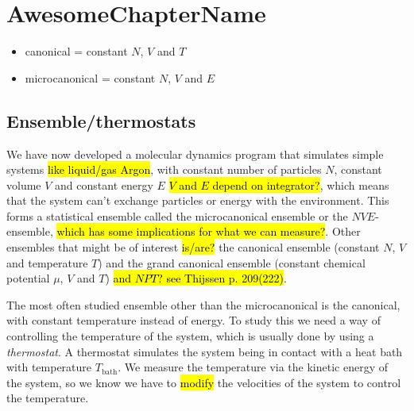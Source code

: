 \chapter{AwesomeChapterName}

\begin{itemize}
    \item canonical = constant $N$, $V$ and $T$
    \item microcanonical = constant $N$, $V$ and $E$
\end{itemize}


\section{Ensemble/thermostats}
We have now developed a molecular dynamics program that simulates simple systems \hl{like liquid/gas Argon}, with constant number of particles $N$, constant volume $V$ and constant energy $E$ \hl{$V$ and $E$ depend on integrator?}, which means that the system can't exchange particles or energy with the environment. This forms a statistical ensemble called the microcanonical ensemble or the $NVE$-ensemble, \hl{which has some implications for what we can measure?}. Other ensembles that might be of interest \hl{is/are?} the canonical ensemble (constant $N$, $V$ and temperature $T$) and the grand canonical ensemble (constant chemical potential $\mu$, $V$ and $T$) \hl{and $NPT$? see Thijssen p. 209(222)}.


The most often studied ensemble other than the microcanonical is the canonical, with constant temperature instead of energy. To study this we need a way of controlling the temperature of the system, which is usually done by using a \emph{thermostat}. A thermostat simulates the system being in contact with a heat bath with temperature $T_\text{bath}$.  We measure the temperature via the kinetic energy of the system, so we know we have to \hl{modify} the velocities of the system to control the temperature. 


